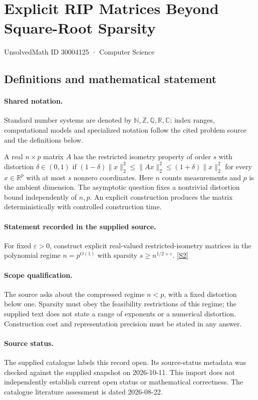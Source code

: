 \documentclass[11pt]{article}
\newcommand{\sref}[2]{\hyperlink{source:#1:#2}{[S#2]}}
\begin{document}
\setcounter{section}{30004124}
\section{Explicit RIP Matrices Beyond Square-Root Sparsity}\label{30004125}
{\small\sffamily UnsolvedMath ID 30004125 · Computer Science}
\subsection{Definitions and mathematical statement}

\paragraph{Shared notation.}Standard number systems are denoted by $\mathbb N,\mathbb Z,\mathbb Q,\mathbb R,\mathbb C$; index ranges, computational models and specialized notation follow the cited problem source and the definitions below.


A real $n\times p$ matrix $A$ has the restricted isometry property of order $s$ with distortion $\delta\in(0,1)$ if $(1-\delta)\|x\|_2^2\leq\|Ax\|_2^2\leq(1+\delta)\|x\|_2^2$ for every $x\in\mathbb R^p$ with at most $s$ nonzero coordinates. Here $n$ counts measurements and $p$ is the ambient dimension. The asymptotic question fixes a nontrivial distortion bound independently of $n,p$. An explicit construction produces the matrix deterministically with controlled construction time.
\paragraph{Statement recorded in the supplied source.}
For fixed $\varepsilon>0$, construct explicit real-valued restricted-isometry matrices in the polynomial regime $n=p^{O(1)}$ with sparsity $s\geq n^{1/2+\varepsilon}$. \sref{30004125}{2}
\paragraph{Scope qualification.}
The source asks about the compressed regime $n<p$, with a fixed distortion below one. Sparsity must obey the feasibility restrictions of this regime; the supplied text does not state a range of exponents or a numerical distortion. Construction cost and representation precision must be stated in any answer.
\paragraph{Source status.}
The supplied catalogue labels this record open. Its source-status metadata was checked against the supplied snapshot on 2026-10-11. This import does not independently establish current open status or mathematical correctness. The catalogue literature assessment is dated 2026-08-22.
\end{document}
